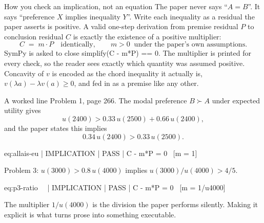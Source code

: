 \documentclass[aspectratio=169,11pt]{beamer}
\newcommand{\code}[1]{{\ttfamily\small #1}}
\begin{document}
\begin{frame}{How you check an implication, not an equation}
  The paper never says ``$A = B$''. It says ``preference $X$ implies inequality $Y$''.
  \vfill
  Write each inequality as a residual the paper asserts is positive. A valid one-step derivation
  from premise residual $P$ to conclusion residual $C$ is exactly the existence of a
  \alert{positive multiplier}:
  \begin{equation*}
    C \;=\; m \cdot P \quad\text{identically},\qquad m > 0 \ \text{ under the paper's own assumptions.}
  \end{equation*}
  \vfill
  SymPy is asked to close \code{simplify(C - m*P) == 0}. The multiplier is printed for every check,
  so the reader sees exactly which quantity was assumed positive.
  \vfill
  {\color{slate} Concavity of $v$ is encoded as the chord inequality it actually is,
  $v(\lambda a) - \lambda v(a) \ge 0$, and fed in as a premise like any other.}
\end{frame}

\begin{frame}{A worked line}
  Problem 1, page 266. The modal preference $B \succ A$ under expected utility gives
  \begin{equation*}
    u(2400) > 0.33\,u(2500) + 0.66\,u(2400),
  \end{equation*}
  and the paper states this implies
  \begin{equation*}
    0.34\,u(2400) > 0.33\,u(2500).
  \end{equation*}
  \vfill
  \begin{center}
  {\ttfamily\scriptsize
  eq:allais-eu | IMPLICATION | {\color{okgreen}PASS} | C - m*P = 0 \ [m = 1]}
  \end{center}
  \vfill
  Problem 3: $u(3000) > 0.8\,u(4000)$ implies $u(3000)/u(4000) > 4/5$.
  \begin{center}
  {\ttfamily\scriptsize
  eq:p3-ratio \ \ | IMPLICATION | {\color{okgreen}PASS} | C - m*P = 0 \ [m = 1/u4000]}
  \end{center}
  \vfill
  The multiplier $1/u(4000)$ is the division the paper performs silently. Making it explicit is
  what turns prose into something executable.
\end{frame}
\end{document}
